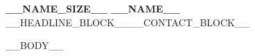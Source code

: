 \documentclass[letterpaper,11pt]{article}
\begin{document}
\begin{center}
    \textbf{__NAME_SIZE__ \scshape __NAME__} \\ \vspace{1pt}
__HEADLINE_BLOCK____CONTACT_BLOCK__\end{center}

__BODY__
\end{document}
